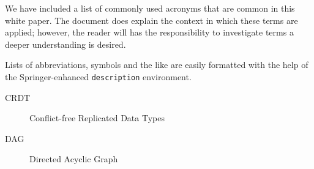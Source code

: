 %
%


We have included a list of commonly used acronyms that are common in this white
paper. The document does explain the context in which these terms are applied;
however, the reader will has the responsibility to investigate terms a deeper
understanding is desired.

Lists of abbreviations,
symbols and the like are easily formatted with the help
of the Springer-enhanced \verb|description| environment.

\begin{description}
\item[CRDT]{Conflict-free Replicated Data Types}
\item[DAG]{Directed Acyclic Graph}
\end{description}
